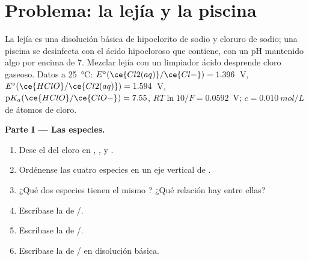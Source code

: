 \section{Problema: la lejía y la piscina}

\begin{problem}
\label{pb:b1:e-ph-diagrams:1}
La lejía es una disolución básica de hipoclorito de sodio y cloruro de
sodio; una piscina se desinfecta con el ácido hipocloroso que contiene,
con un pH mantenido algo por encima de 7. Mezclar lejía con un limpiador
ácido desprende cloro gaseoso. Datos a \qty{25}{\celsius}:
$E^\circ(\ce{Cl2(aq)}/\ce{Cl-})
= 1.396$~V, $E^\circ(\ce{HClO}/\ce{Cl2(aq)}) = 1.594$~V,
$\mathrm{p}K_a(\ce{HClO}/\ce{ClO-}) = 7.55$, $RT\ln 10/F = 0.0592$~V;
 $c = \qty{0.010}{mol/L}$ de átomos de cloro.

\medskip
\noindent\textbf{Parte I --- Las especies.}
\begin{enumerate}
  \item Dese el  del cloro en , ,
         y .
  \item Ordénense las cuatro especies en un eje vertical de .
  \item ¿Qué dos especies tienen el mismo ? ¿Qué
        relación hay entre ellas?
  \item Escríbase la  de /.
  \item Escríbase la  de /.
  \item Escríbase la  de / en disolución
        básica.
\end{enumerate}


\end{problem}

